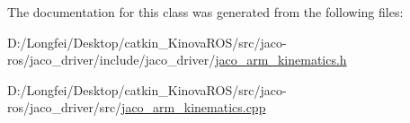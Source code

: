 The documentation for this class was generated from the following files\+:\begin{DoxyCompactItemize}
\item 
D\+:/\+Longfei/\+Desktop/catkin\+\_\+\+Kinova\+R\+O\+S/src/jaco-\/ros/jaco\+\_\+driver/include/jaco\+\_\+driver/\hyperlink{jaco__arm__kinematics_8h}{jaco\+\_\+arm\+\_\+kinematics.\+h}\item 
D\+:/\+Longfei/\+Desktop/catkin\+\_\+\+Kinova\+R\+O\+S/src/jaco-\/ros/jaco\+\_\+driver/src/\hyperlink{jaco__arm__kinematics_8cpp}{jaco\+\_\+arm\+\_\+kinematics.\+cpp}\end{DoxyCompactItemize}
